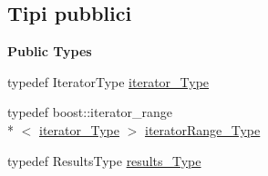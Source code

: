 \subsection*{Tipi pubblici}
\begin{Indent}{\bf Public Types}\par
\begin{DoxyCompactItemize}
\item 
typedef Iterator\-Type \hyperlink{classLifeV_1_1ParserSpiritGrammar_aaa28e2ed8f68d686da1e0bcc5834ed3b}{iterator\-\_\-\-Type}
\item 
typedef boost\-::iterator\-\_\-range\\*
$<$ \hyperlink{classLifeV_1_1ParserSpiritGrammar_aaa28e2ed8f68d686da1e0bcc5834ed3b}{iterator\-\_\-\-Type} $>$ \hyperlink{classLifeV_1_1ParserSpiritGrammar_a8aca47ceac2876986dbc2ff9ee4d2edd}{iterator\-Range\-\_\-\-Type}
\item 
typedef Results\-Type \hyperlink{classLifeV_1_1ParserSpiritGrammar_a98dabec1a4a9a743a1d3b35e994cec7c}{results\-\_\-\-Type}
\end{DoxyCompactItemize}
\end{Indent}
